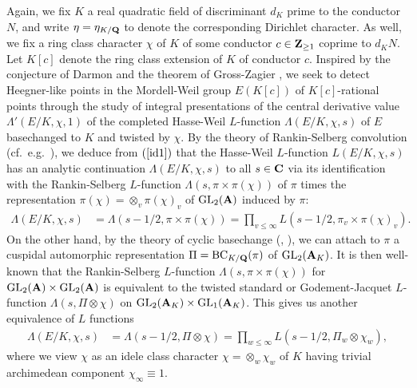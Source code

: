 \documentclass{amsart}
\theoremstyle{definition}
\begin{document}
Again, we fix $K$ a real quadratic field of discriminant $d_K$ prime to the conductor $N$, and write $\eta = \eta_{K/ {\bf{Q}}}$
to denote the corresponding Dirichlet character. As well, we fix a ring class character $\chi$ of $K$ of some conductor $c \in {\bf{Z}}_{\geq 1}$
coprime to $d_K N$. Let $K[c]$ denote the ring class extension of $K$ of conductor $c$. 
Inspired by the conjecture of Darmon \cite[Conjecture 5.6]{Da} and the theorem of Gross-Zagier \cite{GZ},
we seek to detect Heegner-like points in the Mordell-Weil group $E(K[c])$
of $K[c]$-rational points through the study of integral presentations of the central derivative value $\Lambda'(E/K, \chi, 1)$ of the completed Hasse-Weil
$L$-function $\Lambda(E/K, \chi, s)$ of $E$ basechanged to $K$ and twisted by $\chi$. 
By the theory of Rankin-Selberg convolution (cf.~e.g.~\cite{GZ}),
we deduce from $(\ref{id1})$ that the Hasse-Weil $L$-function $L(E/K, \chi, s)$ has an analytic continuation 
$\Lambda(E/K, \chi, s)$ to all $s \in {\bf{C}}$ via its identification with the Rankin-Selberg $L$-function 
$\Lambda(s, \pi \times \pi(\chi))$ of $\pi$ times the representation
$\pi(\chi) = \otimes_v \pi(\chi)_v$ of $\operatorname{GL}_2({\bf{A}})$ induced by $\pi$:
\begin{align}\label{id2} \Lambda(E/K, \chi, s) &= \Lambda(s-1/2, \pi \times \pi(\chi)) = \prod_{v \leq \infty} L(s-1/2, \pi_v \times \pi(\chi)_v). \end{align} 
On the other hand, by the theory of cyclic basechange (\cite{La}, \cite{AC}), we can attach
to $\pi$ a cuspidal automorphic representation $\Pi = \operatorname{BC}_{K/{\bf{Q}}}(\pi)$ of $\operatorname{GL}_2({\bf{A}}_K)$.
It is then well-known that the Rankin-Selberg $L$-function $\Lambda(s, \pi \times \pi(\chi))$ 
for $\operatorname{GL}_2({\bf{A}}) \times \operatorname{GL}_2({\bf{A}})$
is equivalent to the twisted standard or Godement-Jacquet $L$-function 
$\Lambda(s, \Pi \otimes \chi)$ on $\operatorname{GL}_2({\bf{A}}_K) \times \operatorname{GL}_1({\bf{A}}_K)$.
This gives us another equivalence of $L$ functions 
\begin{align}\label{id3} \Lambda(E/K, \chi, s) &= \Lambda(s-1/2, \Pi \otimes \chi) = \prod_{w \leq \infty} L(s-1/2, \Pi_w \otimes \chi_w), \end{align}
where we view $\chi$ as an idele class character $\chi = \otimes_w \chi_w$ of $K$ having trivial archimedean component $\chi_{\infty} \equiv 1$.
\end{document}
